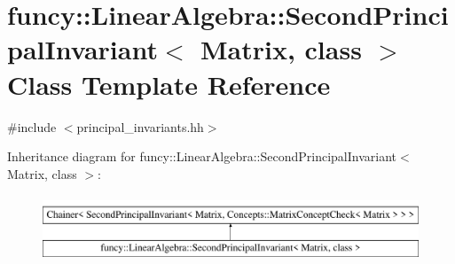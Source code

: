 \hypertarget{classfuncy_1_1LinearAlgebra_1_1SecondPrincipalInvariant}{\section{funcy\-:\-:Linear\-Algebra\-:\-:Second\-Principal\-Invariant$<$ Matrix, class $>$ Class Template Reference}
\label{classfuncy_1_1LinearAlgebra_1_1SecondPrincipalInvariant}
}


{\ttfamily \#include $<$principal\-\_\-invariants.\-hh$>$}

Inheritance diagram for funcy\-:\-:Linear\-Algebra\-:\-:Second\-Principal\-Invariant$<$ Matrix, class $>$\-:\begin{figure}[H]
\begin{center}
\leavevmode
\includegraphics[height=2.000000cm]{classfuncy_1_1LinearAlgebra_1_1SecondPrincipalInvariant}
\end{center}
\end{figure}

